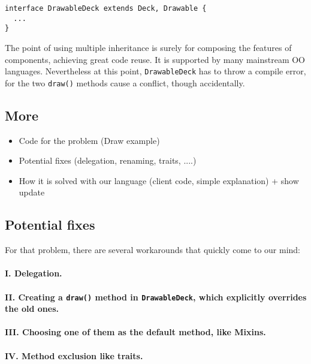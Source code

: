 \begin{lstlisting}
interface DrawableDeck extends Deck, Drawable {
  ...
} 
\end{lstlisting}
The point of using multiple inheritance is surely for composing the features of
components, achieving great code reuse. It is supported by many mainstream OO
languages. Nevertheless at this point, \lstinline|DrawableDeck| has to throw a compile
error, for the two \lstinline|draw()| methods cause a conflict, though accidentally.

\subsection{More}
\begin{itemize}
	\item Code for the problem (Draw example)
	\item Potential fixes (delegation, renaming, traits, ....)
	\item How it is solved with our language (client code, simple explanation) + show update
\end{itemize}


\subsection{Potential fixes}

For that problem, there are several workarounds that quickly come to our mind:

\paragraph{I. Delegation.}

\paragraph{II. Creating a \lstinline|draw()| method in \lstinline|DrawableDeck|, which explicitly overrides the old ones.}

\paragraph{III. Choosing one of them as the default method, like Mixins.}

\paragraph{IV. Method exclusion like traits.}

